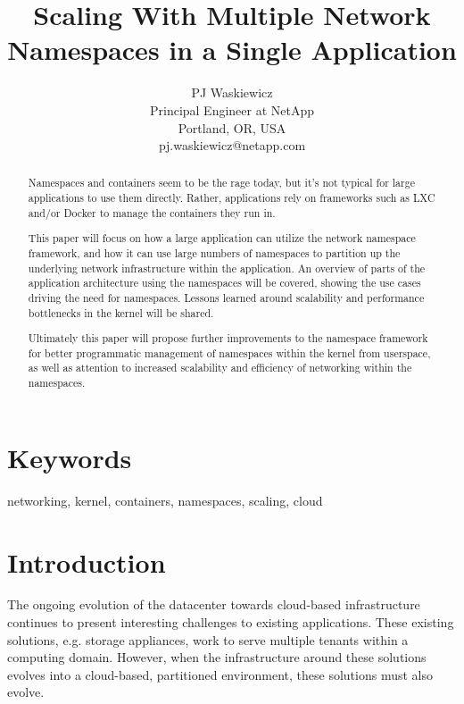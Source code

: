\documentclass[letterpaper]{article}
\title{Scaling With Multiple Network Namespaces in a Single Application}
\author{PJ Waskiewicz\\
Principal Engineer at NetApp\\
Portland, OR, USA\\
pj.waskiewicz@netapp.com\\
\newline
\newline
}
\begin{document}
 
\maketitle
\begin{abstract}
Namespaces and containers seem to be the rage today, but it’s not typical for large applications to use them directly. Rather, applications rely on frameworks such as LXC and/or Docker to manage the containers they run in.

This paper will focus on how a large application can utilize the network namespace framework, and how it can use large numbers of namespaces to partition up the underlying network infrastructure within the application. An overview of parts of the application architecture using the namespaces will be covered, showing the use cases driving the need for namespaces. Lessons learned around scalability and performance bottlenecks in the kernel will be shared.

Ultimately this paper will propose further improvements to the namespace framework for better programmatic management of namespaces within the kernel from userspace, as well as attention to increased scalability and efficiency of networking within the namespaces.
\end{abstract}

\section{Keywords}

networking, kernel, containers, namespaces, scaling, cloud

\section{Introduction}
The ongoing evolution of the datacenter towards cloud-based infrastructure continues to present interesting challenges to existing applications. These existing solutions, e.g. storage appliances, work to serve multiple tenants within a computing domain. However, when the infrastructure around these solutions evolves into a cloud-based, partitioned environment, these solutions must also evolve.
\end{document}
